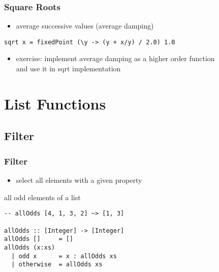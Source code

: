\documentclass[dvipsnames]{beamer}
\theoremstyle{plain}
\begin{document}
\begin{frame}[fragile]
  \frametitle{Square Roots}

  \begin{itemize}
    \item average successive values (average damping)
  \end{itemize}

  \begin{exampleblock}{}
    \begin{lstlisting}[deletekeywords={sqrt}]
sqrt x = fixedPoint (\y -> (y + x/y) / 2.0) 1.0
    \end{lstlisting}
  \end{exampleblock}

  \pause
  \begin{itemize}
    \item exercise: implement average damping as a higher order function\\
      and use it in sqrt implementation
  \end{itemize}
\end{frame}

\section{List Functions}

\subsection{Filter}

\begin{frame}[fragile]
  \frametitle{Filter}

  \begin{itemize}
    \item select all elements with a given property
  \end{itemize}

  \begin{exampleblock}{all odd elements of a list}
    \begin{lstlisting}
-- allOdds [4, 1, 3, 2] ~> [1, 3]

allOdds :: [Integer] -> [Integer]
allOdds []     = []
allOdds (x:xs)
  | odd x      = x : allOdds xs
  | otherwise  = allOdds xs
    \end{lstlisting}
  \end{exampleblock}
\end{frame}
\end{document}
